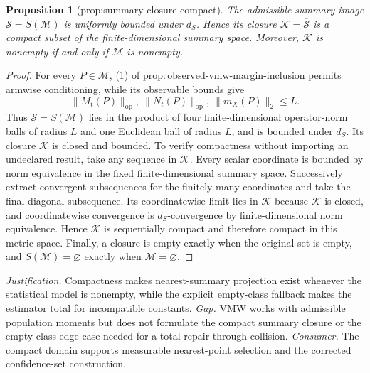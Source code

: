 \documentclass{article}
\newtheorem{proposition}{Proposition}
\begin{document}
\begin{proposition}[prop:summary-closure-compact]\label{prop:summary-closure-compact}
The admissible summary image \(\mathscr S=S(\mathcal M)\) is uniformly bounded under \(d_S\). Hence its closure \(\mathcal K=\overline{\mathscr S}\) is a compact subset of the finite-dimensional summary space. Moreover, \(\mathcal K\) is nonempty if and only if \(\mathcal M\) is nonempty.
\end{proposition}
\begin{proof}
For every \(P\in\mathcal M\), (1) of \(\mathrm{prop:observed\text{-}vmw\text{-}margin\text{-}inclusion}\) permits armwise conditioning, while its observable bounds give
\[
\lVert M_t(P)\rVert_{\mathrm{op}},\ \lVert N_t(P)\rVert_{\mathrm{op}},\ 
\lVert m_X(P)\rVert_2\le L.                                                    \tag{15}
\]
Thus \(\mathscr S=S(\mathcal M)\) lies in the product of four finite-dimensional operator-norm balls of radius \(L\) and one Euclidean ball of radius \(L\), and is bounded under \(d_S\).  Its closure \(\mathcal K\) is closed and bounded.  To verify compactness without importing an undeclared result, take any sequence in \(\mathcal K\).  Every scalar coordinate is bounded by norm equivalence in the fixed finite-dimensional summary space.  Successively extract convergent subsequences for the finitely many coordinates and take the final diagonal subsequence.  Its coordinatewise limit lies in \(\mathcal K\) because \(\mathcal K\) is closed, and coordinatewise convergence is \(d_S\)-convergence by finite-dimensional norm equivalence.  Hence \(\mathcal K\) is sequentially compact and therefore compact in this metric space.  Finally, a closure is empty exactly when the original set is empty, and \(S(\mathcal M)=\varnothing\) exactly when \(\mathcal M=\varnothing\).
\end{proof}
\par\smallskip\noindent \textit{Justification.} Compactness makes nearest-summary projection exist whenever the statistical model is nonempty, while the explicit empty-class fallback makes the estimator total for incompatible constants. \textit{Gap.} VMW works with admissible population moments but does not formulate the compact summary closure or the empty-class edge case needed for a total repair through collision. \textit{Consumer.} The compact domain supports measurable nearest-point selection and the corrected confidence-set construction.
\end{document}
